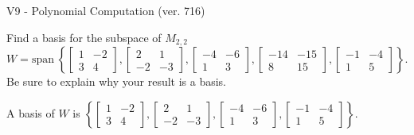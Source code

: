 \begin{exercise}
  \begin{exerciseTitle}V9 - Polynomial Computation (ver. 716)\end{exerciseTitle}
  \begin{exerciseStatement}
    Find a basis for the subspace of \(M_{2,2}\) 
\[W=\mathrm{span}\ \left\{\left[\begin{array}{cc}
1 & -2 \\
3 & 4
\end{array}\right] , \left[\begin{array}{cc}
2 & 1 \\
-2 & -3
\end{array}\right] , \left[\begin{array}{cc}
-4 & -6 \\
1 & 3
\end{array}\right] , \left[\begin{array}{cc}
-14 & -15 \\
8 & 15
\end{array}\right] , \left[\begin{array}{cc}
-1 & -4 \\
1 & 5
\end{array}\right]\right\}.\]
 Be sure to explain why your result is a basis.


  \end{exerciseStatement}
  \begin{exerciseAnswer}
   A basis of \(W\) is  \(\left\{\left[\begin{array}{cc}
1 & -2 \\
3 & 4
\end{array}\right] , \left[\begin{array}{cc}
2 & 1 \\
-2 & -3
\end{array}\right] , \left[\begin{array}{cc}
-4 & -6 \\
1 & 3
\end{array}\right] , \left[\begin{array}{cc}
-1 & -4 \\
1 & 5
\end{array}\right]\right\}\).
  


  \end{exerciseAnswer}
\end{exercise}